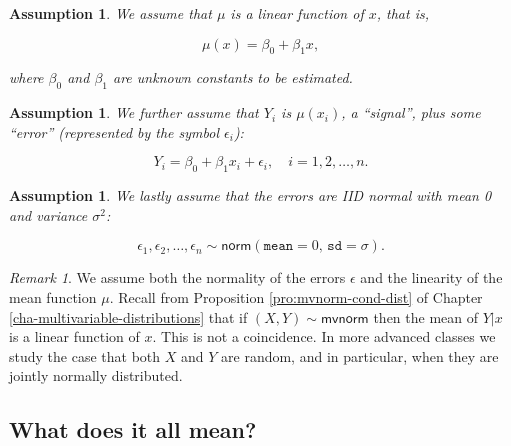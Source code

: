 \documentclass[]{book}
\numberwithin{equation}{chapter}
\numberwithin{figure}{chapter}
\theoremstyle{plain}
\newtheorem{assumption}[thm]{Assumption}
\theoremstyle{definition}
\theoremstyle{remark}
\newtheorem{rem}[thm]{Remark}
\theoremstyle{definition}
\theoremstyle{definition}
\theoremstyle{remark}
\begin{document}
\begin{assumption}
We assume that \(\mu\) is a linear function of \(x\), that is,

\begin{equation}
\mu(x)=\beta_{0}+\beta_{1}x,
\end{equation}

where \(\beta_{0}\) and \(\beta_{1}\) are unknown constants to be
estimated. \bigskip
\end{assumption}\begin{assumption}
We further assume that \(Y_{i}\) is \(\mu(x_{i})\), a ``signal'', plus
some ``error'' (represented by the symbol \(\epsilon_{i}\)):

\begin{equation}
Y_{i} = \beta_{0} + \beta_{1}x_{i} + \epsilon_{i}, \quad i = 1,2,\ldots,n.
\end{equation}
\end{assumption}

\bigskip

\begin{assumption}
We lastly assume that the errors are IID normal with mean 0 and variance
\(\sigma^{2}\):

\begin{equation}
\epsilon_{1},\epsilon_{2},\ldots,\epsilon_{n}\sim\mathsf{norm}(\mathtt{mean}=0,\,\mathtt{sd}=\sigma).
\end{equation}
\end{assumption}

\bigskip

\begin{rem}
We assume both the normality of the errors \(\epsilon\) and the
linearity of the mean function \(\mu\). Recall from Proposition
\ref{pro:mvnorm-cond-dist} of Chapter
\ref{cha-multivariable-distributions} that if
\((X,Y) \sim \mathsf{mvnorm}\) then the mean of \(Y|x\) is a linear
function of \(x\). This is not a coincidence. In more advanced classes
we study the case that both \(X\) and \(Y\) are random, and in
particular, when they are jointly normally distributed.
\end{rem}

\subsection{What does it all mean?}\label{what-does-it-all-mean}
\end{document}
